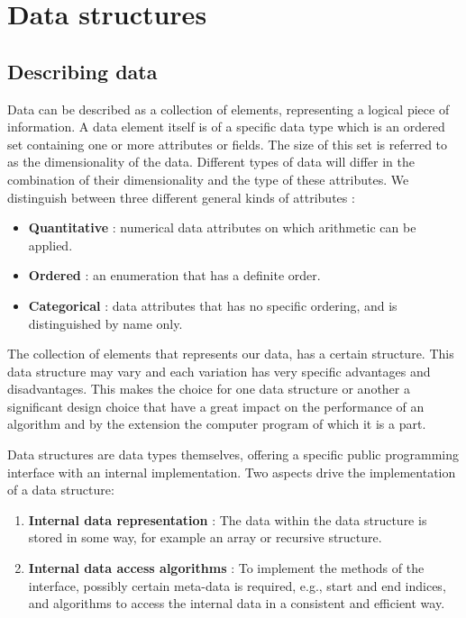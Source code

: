 \chapter{Data structures}\label{chapter:datastructures}

\section{Describing data}

Data can be described as a collection of elements, representing a logical piece of information. A data element itself is of a specific data type which is an ordered set containing one or more attributes or fields. The size of this set is referred to as the dimensionality of the data. Different types of data will differ in the combination of their dimensionality and the type of these attributes. We distinguish between three different general kinds of attributes \cite{Shirley:2009:FCG:1628957}:
\begin{itemize}
	\item \textbf{Quantitative} : numerical data attributes on which arithmetic can be applied.
	\item \textbf{Ordered} : an enumeration that has a definite order.
	\item \textbf{Categorical} : data attributes that has no specific ordering, and is distinguished by name only.
\end{itemize}


The collection of elements that represents our data, has a certain structure. This data structure may vary and each variation has very specific advantages and disadvantages. This makes the choice for one data structure or another a significant design choice that have a great impact on the performance of an algorithm and by the extension the computer program of which it is a part.

Data structures are data types themselves, offering a specific public programming interface with an internal implementation. Two aspects drive the implementation of a data structure:
\begin{enumerate}
	\item \textbf{Internal data representation} : The data within the data structure is stored in some way, for example an array or recursive structure.
	\item \textbf{Internal data access algorithms} : To implement the methods of the interface, possibly certain meta-data is required, e.g., start and end indices, and algorithms to access the internal data in a consistent and efficient way.
\end{enumerate}

